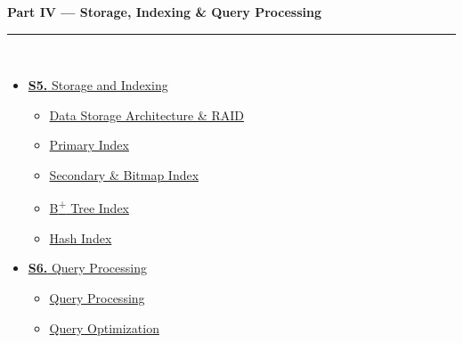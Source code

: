 \documentclass[12pt]{article}
\begin{document}
\begin{tcolorbox}[breakable,colback=cD!5,colframe=cD,boxrule=1pt,arc=5pt,
  left=8pt,right=8pt,top=8pt,bottom=8pt,before skip=4pt]
  {\large\bfseries\textcolor{cD}{Part IV --- Storage, Indexing \& Query Processing}}\\[5pt]
  \textcolor{cD!40}{\rule{\textwidth}{0.4pt}}\\[3pt]
  \small\begin{itemize}[leftmargin=1.2em,itemsep=1pt,label={\textcolor{cD}{$\triangleright$}}]
    \item \hyperref[sec:S5]{\textbf{S5.} Storage and Indexing}
      \begin{itemize}[leftmargin=1.5em,itemsep=0pt,label={\textcolor{cD}{$\cdot$}}]
        \item \hyperref[sub:s5-storage]{Data Storage Architecture \& RAID}
        \item \hyperref[sub:s5-primary]{Primary Index}
        \item \hyperref[sub:s5-secondary]{Secondary \& Bitmap Index}
        \item \hyperref[sub:s5-btree]{B\textsuperscript{+} Tree Index}
        \item \hyperref[sub:s5-hash]{Hash Index}
      \end{itemize}
    \item \hyperref[sec:S6]{\textbf{S6.} Query Processing}
      \begin{itemize}[leftmargin=1.5em,itemsep=0pt,label={\textcolor{cD}{$\cdot$}}]
        \item \hyperref[sub:s6-qp]{Query Processing}
        \item \hyperref[sub:s6-qo]{Query Optimization}
      \end{itemize}
  \end{itemize}
\end{tcolorbox}
\end{document}
